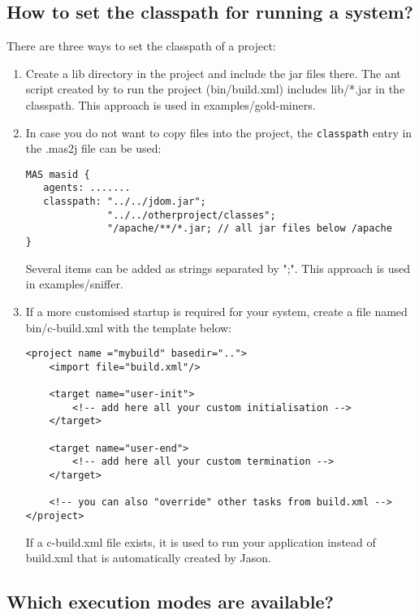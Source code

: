 \documentclass{article}
\newcommand{\jason}[0]{\htlink{\textit{Jason}}{http://jason.sf.net}\xspace}
\begin{document}
\subsection{How to set the classpath for running a system?}

There are three ways to set the classpath of a project:
\begin{enumerate}
\item Create a lib directory in the project and include the jar files
  there. The ant script created by \jason to run the project
  (bin/build.xml) includes lib/*.jar in the classpath. This approach
  is used in examples/gold-miners.

\item In case you do not want to copy files into the project, the
  \texttt{classpath} entry in the .mas2j file can be used:
\begin{verbatim}
MAS masid {
   agents: .......
   classpath: "../../jdom.jar"; 
              "../../otherproject/classes";
              "/apache/**/*.jar; // all jar files below /apache
}
\end{verbatim}
  Several items can be added as strings separated by ";". This
  approach is used in examples/sniffer.

\item If a more customised startup is required for your system, create
  a file named bin/c-build.xml with the template below:

\begin{verbatim}
<project name ="mybuild" basedir="..">
    <import file="build.xml"/>
	
    <target name="user-init">
        <!-- add here all your custom initialisation -->
    </target>
	
    <target name="user-end">
        <!-- add here all your custom termination -->
    </target>

    <!-- you can also "override" other tasks from build.xml -->
</project>
\end{verbatim}
  If a c-build.xml file exists, it is used to run your application
  instead of build.xml that is automatically created by Jason.
\end{enumerate}

\subsection{Which execution modes are available?}
\end{document}
